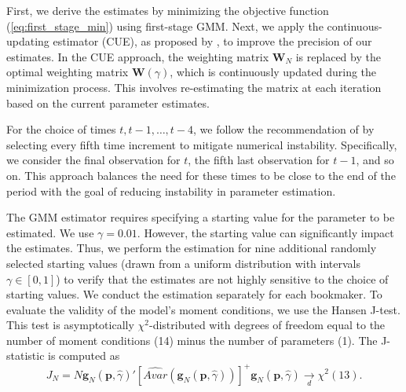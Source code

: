 \documentclass[webpdf,modern,medium]{oup-authoring-template}
\newcommand{\bs}{\boldsymbol}
\theoremstyle{thmstyleone}%
\theoremstyle{thmstyletwo}%
\theoremstyle{thmstylethree}%
\begin{document}
    First, we derive the estimates by minimizing the objective function (\ref{eq:first_stage_min}) using first-stage GMM. Next, we apply the continuous-updating estimator (CUE), as proposed by \citet{hansen1996}, to improve the precision of our estimates. In the CUE approach, the weighting matrix \(\bs{W}_N\) is replaced by the optimal weighting matrix \(\bs{W}(\gamma)\), which is continuously updated during the minimization process. This involves re-estimating the matrix at each iteration based on the current parameter estimates.



    For the choice of times $t, t-1, \ldots, t-4$,  we follow the recommendation of \citet{biais1999} by selecting every fifth time increment to mitigate numerical instability. Specifically, we consider the final observation for $t$, the fifth last observation for $t−1$, and so on. This approach balances the need for these times to be close to the end of the period with the goal of reducing instability in parameter estimation.

    The GMM estimator requires specifying a starting value for the parameter to be estimated. We use $\gamma=0.01$. However, the starting value can significantly impact the estimates. Thus, we perform the estimation for nine additional randomly selected starting values (drawn from a uniform distribution with intervals $\gamma \in [0, 1]$) to verify that the estimates are not highly sensitive to the choice of starting values. We conduct the estimation separately for each bookmaker.
    To evaluate the validity of the model's moment conditions, we use the Hansen J-test. This test is asymptotically \(\chi^2\)-distributed with degrees of freedom equal to the number of moment conditions (14) minus the number of parameters (1). The J-statistic is computed as
    \begin{equation*}
        J_N = N \bs{g}_N(\bs{p},\hat{\gamma})'\left[\widehat{Avar}(\bs{g}_N(\bs{p},\hat{\gamma}))\right]^+\bs{g}_N(\bs{p},\hat{\gamma}) \xrightarrow[d]{} \chi^2\left(13\right).
    \end{equation*}
\end{document}
